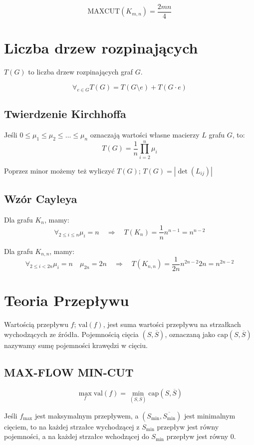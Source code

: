 \documentclass{../notatki}
\newcommand{\maxcut}{\textrm{MAXCUT}}
\begin{document}
$$
\maxcut(K_{m, n}) = \frac{2mn}{4}
$$

\section{Liczba drzew rozpinających}

$T(G)$ to liczba drzew rozpinających graf $G$.

$$
\forall_{e \in G} T(G) = T(G \setminus e) + T(G \cdot e)
$$

\subsection{Twierdzenie Kirchhoffa}

Jeśli $0 \leq \mu_1 \leq \mu_2 \leq \dots \leq \mu_n$ oznaczają wartości własne
macierzy $L$ grafu $G$, to:
$$
T(G) = \frac{1}{n} \prod_{i = 2}^n \mu_i
$$

Poprzez minor możemy też wyliczyć $T(G)$; $T(G) = |\det(L_{ij})|$

\subsection{Wzór Cayleya}

Dla grafu $K_n$, mamy:
$$
\forall_{2 \leq i \leq n} \mu_i = n \quad \Rightarrow \quad T(K_n) =
\frac{1}{n} n^{n-1} = n^{n-2}
$$

Dla grafu $K_{n, n}$, mamy:
$$
\forall_{2 \leq i < 2n} \mu_i = n \quad \mu_{2n} = 2n \quad \Rightarrow
\quad T(K_{n, n}) = \frac{1}{2n} n^{2n-2} 2n = n^{2n-2}
$$

\section{Teoria Przepływu}

Wartością przepływu $f$; $\textrm{val}(f)$, jest suma wartości przepływu
na strzałkach wychodzących ze źródła. Pojemnością cięcia $(S, \overline{S})$,
oznaczaną jako $\textrm{cap}(S, \overline{S})$ nazywamy sumę pojemności krawędzi
w cięciu.

\subsection{MAX-FLOW MIN-CUT}

$$
\max_f \textrm{val}(f) = \min_{(S, \overline{S})} \textrm{cap}(S, \overline{S})
$$

Jeśli $f_{\max}$ jest maksymalnym przepływem, a $(S_{\min},
\overline{S_{\min}})$ jest minimalnym cięciem, to na każdej strzałce
wychodzącej z $S_{\min}$ przepływ jest równy pojemności, a na każdej
strzałce wchodzącej do $S_{\min}$ przepływ jest równy 0.
\end{document}
